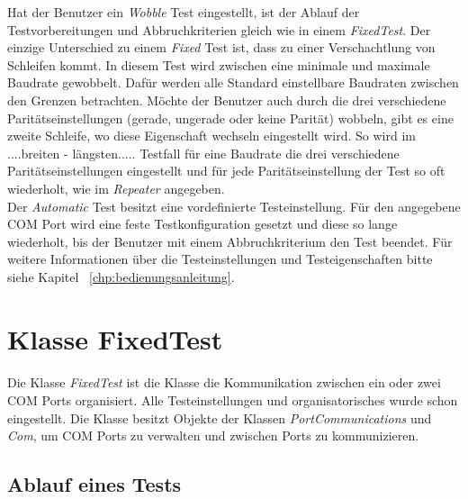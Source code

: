 Hat der Benutzer ein \textit{Wobble} Test eingestellt, ist der Ablauf der Testvorbereitungen und Abbruchkriterien gleich wie in einem \textit{FixedTest}. Der einzige Unterschied zu einem \textit{Fixed} Test ist, dass zu einer Verschachtlung von Schleifen kommt. In diesem Test wird zwischen eine minimale und maximale Baudrate gewobbelt. Dafür werden alle Standard einstellbare Baudraten zwischen den Grenzen betrachten. Möchte der Benutzer auch durch die drei verschiedene Paritätseinstellungen (gerade, ungerade oder keine Parität) wobbeln, gibt es eine zweite Schleife, wo diese Eigenschaft wechseln eingestellt wird. So wird im ....breiten - längsten..... Testfall für eine  Baudrate die drei verschiedene Paritätseinstellungen eingestellt und für jede Paritätseinstellung der Test so oft wiederholt, wie im \textit{Repeater} angegeben.\\

Der \textit{Automatic} Test besitzt eine vordefinierte Testeinstellung. Für den angegebene COM Port wird eine feste Testkonfiguration gesetzt und diese so lange wiederholt, bis der Benutzer mit einem Abbruchkriterium den Test beendet. Für weitere Informationen über die Testeinstellungen und Testeigenschaften bitte siehe Kapitel ~\ref{chp:bedienungsanleitung}.

\newpage


\section{Klasse FixedTest}\label{FixedTextClass}
\paragraph{}
Die Klasse \textit{FixedTest} ist die Klasse die Kommunikation zwischen ein oder zwei COM Ports organisiert. Alle Testeinstellungen und organisatorisches wurde schon eingestellt. Die Klasse besitzt Objekte der Klassen \textit{PortCommunications} und \textit{Com}, um COM Ports zu verwalten und zwischen Ports zu kommunizieren.\\

\subsection{Ablauf eines Tests}
